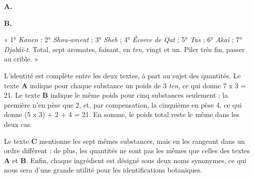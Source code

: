 \documentclass[a4paper, 11pt, oneside]{article}
\newcommand*\hieroAAAR{}
\newcommand*\hieroAADS{}
\newcommand*\hieroAADT{}
\newcommand*\hieroAADU{}
\newcommand*\hieroAAFM{}
\newcommand*\hieroAAFT{}
\newcommand*\hieroAAGK{}
\newcommand*\hieroAAGL{}
\newcommand*\hieroAAGM{}
\newcommand*\hieroAAGN{}
\newcommand*\hieroAAGO{}
\newcommand*\hieroAAGP{}
\newcommand*\hieroAAGQ{}
\newcommand*\hieroAAGR{}
\newcommand*\hieroAAGS{\raisebox{0.4ex}{}}
\newcommand*\hieroAAGT{}
\newcommand*\hieroAAGU{}
\newcommand*\hieroAAGV{\raisebox{0.7ex}{}}
\newcommand*\hieroAAGW{\raisebox{0.4ex}{}}
\newcommand*\hieroAAGX{}
\newcommand*\hieroAAGY{}
\newcommand*\hieroAAGZ{}
\begin{document}
\hspace*{10mm}\textbf{A.}\hspace*{5mm} $\hieroAAGK\:\hieroAAGL\:\hieroAAFM$ \hspace*{7.8mm} $\hieroAADU\:\hieroAADS\:\hieroAADT\:\hieroAAAR\:\hieroAAGM$ \hspace*{5.6mm} $\hieroAAGN\:\hieroAAGO\:\hieroAAGP\:\hieroAAGQ\:\hieroAAGR\:\hieroAAGS$

\hspace*{10mm}\textbf{B.}\hspace*{5mm} $\hieroAAGT\:\hieroAAGU\:\hieroAAFM$ \hspace*{8mm} $\hieroAAGV\:\hieroAADS\:\hieroAADT\:\hieroAAAR\:\hieroAAGW$ \hspace*{4.8mm} $\hieroAAGV\:\hieroAAFT\:\hieroAAGX\:\hieroAAGP\:\hieroAAGY\:\hieroAAGZ\:\hieroAAGS$

« 1° \emph{Kanen} ; 2° \emph{Shou-ament} ; 3° \emph{Sheb} ; 4° \emph{Écorce de Qat} ; 5° \emph{Tas} ; 6° \emph{Akaï} ; 7° \emph{Djabâï-t}. Total, sept aromates, faisant, en \emph{ten}, vingt et un. Piler très fin, passer au crible. »

L'identité est complète entre les deux textes, à part au sujet des quantités. Le texte \textbf{A} indique pour chaque substance un poids de 3 \emph{ten}, ce qui donne 7 x 3 = 21. Le texte \textbf{B} indique le même poids pour cinq substances seulement ; la première n'en pèse que 2, et, par compensation, la cinquième en pèse 4, ce qui donne (5 x 3) + 2 + 4 = 21. En somme, le poids total reste le même dans les deux cas.

Le texte \textbf{C} mentionne les sept mêmes substances, mais en les rangeant dans un ordre différent ; de plus, les quantités ne sont pas les mêmes que celles des textes \textbf{A} et \textbf{B}. Enfin, chaque ingrédient est désigné sous deux noms synonymes, ce qui nous sera d'une grande utilité pour les identifications botaniques.
\end{document}
